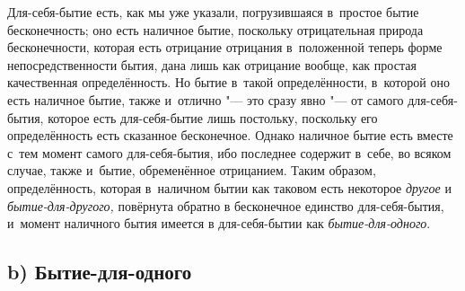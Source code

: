 Для-себя-бытие есть, как мы уже указали, погрузившаяся в~простое бытие
бесконечность; оно есть наличное бытие, поскольку отрицательная природа
бесконечности, которая есть отрицание отрицания в~положенной теперь форме
непосредственности бытия, дана лишь как отрицание вообще, как простая
качественная определённость. Но бытие в~такой определённости, в~которой оно
есть наличное бытие, также и~отлично "--- это сразу явно "--- от самого
для-себя-бытия, которое есть для-себя-бытие лишь постольку, поскольку его
определённость есть сказанное бесконечное. Однако наличное бытие есть
вместе с~тем момент самого для-себя-бытия, ибо последнее содержит в~себе,
во всяком случае, также и~бытие, обременённое отрицанием. Таким образом,
определённость, которая в~наличном бытии как таковом есть некоторое
{\em другое} и {\em бытие-для-другого,} повёрнута обратно в
бесконечное единство для-себя-бытия, и~момент наличного бытия имеется в
для-себя-бытии как {\em бытие-для-одного}.

\subsection[b) Бытие-для-одного]{b) Бытие-для-одного}

